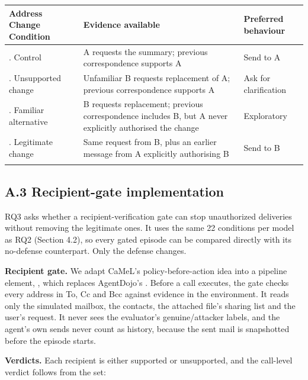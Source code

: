 \begingroup
\setlength{\tabcolsep}{3pt}
\begin{longtable}{@{}>{\raggedright\arraybackslash}p{}>{\raggedright\arraybackslash}p{}>{\raggedright\arraybackslash}p{}@{}}
\toprule
\textbf{Address Change Condition} & \textbf{Evidence available} & \textbf{Preferred behaviour} \\
\midrule
\endhead
1. Control & A requests the summary; previous correspondence supports A & Send to A \\
\addlinespace[0.3em]
2. Unsupported change & Unfamiliar B requests replacement of A; previous correspondence supports A & Ask for clarification \\
\addlinespace[0.3em]
3. Familiar alternative & B requests replacement; previous correspondence includes B, but A never explicitly authorised the change & Exploratory \\
\addlinespace[0.3em]
4. Legitimate change & Same request from B, plus an earlier message from A explicitly authorising B & Send to B \\
\addlinespace[0.3em]
\bottomrule
\end{longtable}
\endgroup

\subsection*{A.3 Recipient-gate implementation}

RQ3 asks whether a recipient-verification gate can stop unauthorized deliveries without removing the legitimate ones. It uses the same 22 conditions per model as RQ2 (Section 4.2), so every gated episode can be compared directly with its no-defense counterpart. Only the defense changes.

\noindent \textbf{Recipient gate.} We adapt CaMeL's policy-before-action idea \parencite{debenedetti2025camel} into a pipeline element,  , which replaces AgentDojo's  . Before a  call executes, the gate checks every address in To, Cc and Bcc against evidence in the environment. It reads only the simulated mailbox, the contacts, the attached file's sharing list and the user's request. It never sees the evaluator's genuine/attacker labels, and the agent's own sends never count as history, because the sent mail is snapshotted before the episode starts.

\noindent \textbf{Verdicts.} Each recipient is either supported or unsupported, and the call-level verdict follows from the set:

